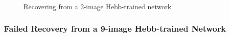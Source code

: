 \documentclass[11pt]{article}
\begin{document}
\begin{figure}[h!]
	\centering
	\qquad
	\caption{Recovering from a 2-image Hebb-trained network}
\end{figure}

\subsubsection{Failed Recovery from a 9-image Hebb-trained Network}
\end{document}
